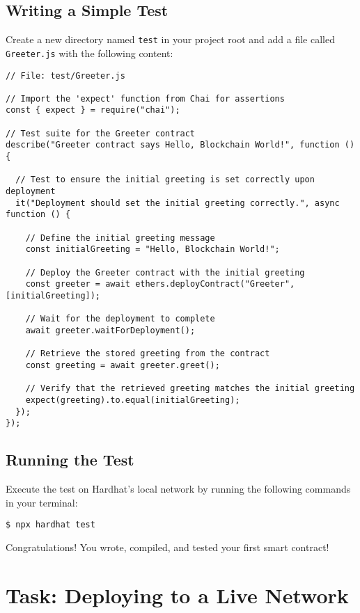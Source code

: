 \documentclass[12pt]{article}
\begin{document}
\subsection{Writing a Simple Test}

Create a new directory named \texttt{test} in your project root and add a file called \texttt{Greeter.js} with the following content:

\begin{verbatim}
// File: test/Greeter.js

// Import the 'expect' function from Chai for assertions
const { expect } = require("chai");

// Test suite for the Greeter contract
describe("Greeter contract says Hello, Blockchain World!", function () {
  
  // Test to ensure the initial greeting is set correctly upon deployment
  it("Deployment should set the initial greeting correctly.", async function () {
    
    // Define the initial greeting message
    const initialGreeting = "Hello, Blockchain World!";
    
    // Deploy the Greeter contract with the initial greeting
    const greeter = await ethers.deployContract("Greeter", [initialGreeting]);
    
    // Wait for the deployment to complete
    await greeter.waitForDeployment();

    // Retrieve the stored greeting from the contract
    const greeting = await greeter.greet();

    // Verify that the retrieved greeting matches the initial greeting
    expect(greeting).to.equal(initialGreeting);
  });
});
\end{verbatim}

\subsection{Running the Test}

Execute the test on Hardhat's local network by running the following commands in your terminal:

\begin{verbatim}
$ npx hardhat test
\end{verbatim}
Congratulations! You wrote, compiled, and tested your first smart contract!

\section{Task: Deploying to a Live Network}
\end{document}
